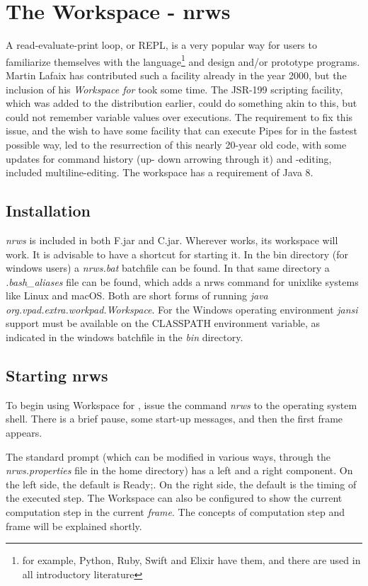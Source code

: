 \chapter{The \nr{} Workspace - nrws}
A read-evaluate-print  loop, or REPL, is a very popular way for users to familiarize themselves with the language\footnote{for example, Python, Ruby, Swift and Elixir have them, and there are used in all introductory literature} and design and/or prototype programs. Martin Lafaix has contributed such a facility already in the year 2000, but the inclusion of his \emph{Workspace for \nr{}} took some time. The JSR-199 scripting facility, which was added to the distribution earlier, could do something akin to this, but could not remember variable values over executions. The requirement to fix this issue, and the wish to have some facility that can execute Pipes for \nr{} in the fastest possible way, led to the resurrection of this nearly 20-year old code, with some updates for command history (up- down arrowing through it) and -editing, included multiline-editing. The \nr{} workspace has a requirement of Java 8.

 \section{Installation}
 \emph{nrws} is included in both \nr{}F.jar and \nr{}C.jar. Wherever \nr{} works, its workspace will work.
 It is advisable to have a shortcut for starting it. In the bin
 directory (for windows users) a \emph{nrws.bat} batchfile can be
 found. In that same directory a \emph{.bash\_aliases} file can be
 found, which adds a nrws command for unixlike systems like Linux and
 macOS. Both are short forms of running \emph{java
 org.vpad.extra.workpad.Workspace}. For the Windows operating
 environment \emph{jansi} support must be available on the CLASSPATH
 environment variable, as indicated in the  windows
 batchfile in the \emph{bin} directory.

\section{Starting nrws}

To begin using Workspace for \nr{}, issue the command \emph{nrws} to the operating system shell. There is a brief pause, some start-up messages, and then the first frame appears.

The standard prompt (which can be modified in various ways, through
the \emph{nrws.properties} file in the home directory) has a left and
a right component. On the left side, the default is Ready;. On the
right side, the default is the timing of the executed step. The
Workspace can also be configured to show the current computation step in the current \emph{frame}. The concepts of computation step and frame will be explained shortly.

